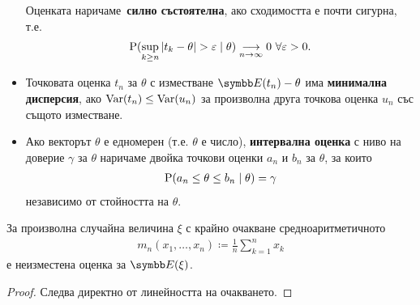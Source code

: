 \documentclass[numbers=endperiod, bibliography=totocnumbered]{scrartcl}
\begin{document}
\begin{definition}[Оценки]
\begin{itemize}
    Оценката наричаме~\textbf{силно състоятелна}, ако сходимостта е почти сигурна, т.е.
    \begin{align*}
      \Prob(\sup_{k \geq n} \Abs{t_k - \theta} > \varepsilon \mid \theta) \Conv[n \to \infty]{} 0~\forall \varepsilon > 0.
    \end{align*}

    \item Точковата оценка \( t_n \) за \( \theta \) с изместване \( \Expect(t_n) - \theta \) има \textbf{минимална дисперсия}, ако \( \Var(t_n) \leq \Var(u_n) \) за произволна друга точкова оценка \( u_n \) със същото изместване.

    \item Ако векторът \( \theta \) е едномерен (т.е. \( \theta \) е число), \textbf{интервална оценка} с ниво на доверие \( \gamma \) за \( \theta \) наричаме двойка точкови оценки \( a_n \) и \( b_n \) за \( \theta \), за които
    \begin{align*}
      \Prob(a_n \leq \theta \leq b_n \mid \theta) = \gamma
    \end{align*}
    независимо от стойността на \( \theta \).
  \end{itemize}
\end{definition}

\begin{proposition}\label{thm:mean_is_unbiased_estimator}
  За произволна случайна величина \( \xi \) с крайно очакване средноаритметичното
  \begin{align*}
    m_n(x_1, \ldots, x_n) \coloneqq \frac 1 n \sum_{k=1}^n x_k
  \end{align*}
  е неизместена оценка за \( \Expect(\xi) \).
\end{proposition}
\begin{proof}
  Следва директно от линейността на очакването.
\end{proof}
\end{document}
